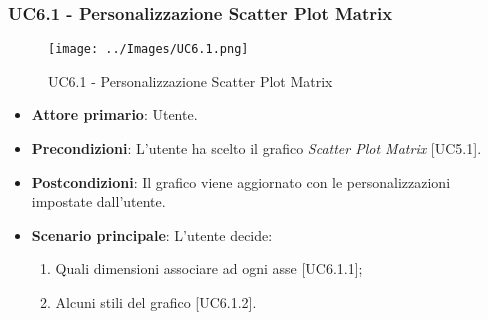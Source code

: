 \subsubsection{UC6.1 - Personalizzazione Scatter Plot Matrix}
\begin{figure}[h]
\texttt{[image: ../Images/UC6.1.png]}
\centering
\caption{UC6.1 - Personalizzazione Scatter Plot Matrix}
\end{figure}
\begin{itemize}
	\item \textbf{Attore primario}: Utente.
	
	\item \textbf{Precondizioni}: L'utente ha scelto il grafico \textit{Scatter Plot Matrix} [UC5.1].
	
	\item \textbf{Postcondizioni}: Il grafico viene aggiornato con le personalizzazioni impostate dall'utente.
	
	\item \textbf{Scenario principale}: L'utente decide:

\begin{enumerate}
\item Quali dimensioni associare ad ogni asse [UC6.1.1];
\item Alcuni stili del grafico [UC6.1.2].
\end{enumerate}	
	
		

\end{itemize}


